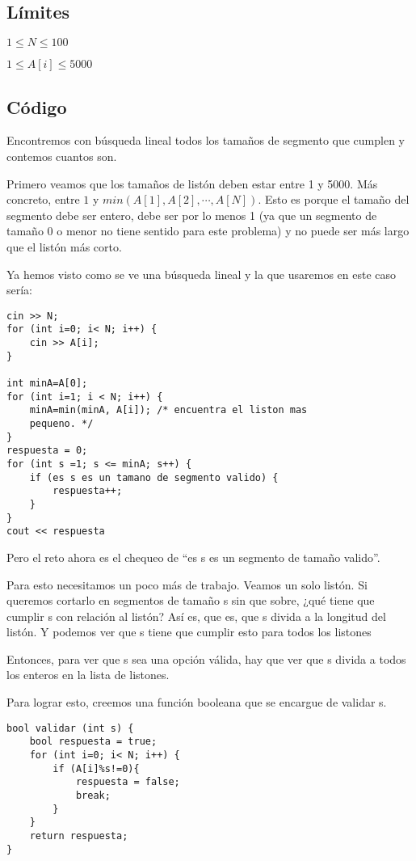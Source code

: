 \subsection*{Límites}
\begin{plimits}
	\item \(1\leq N \leq 100\)
	\item \(1\leq A[i] \leq 5000\)
\end{plimits}

\subsection*{Código}
Encontremos con búsqueda lineal todos los tamaños de segmento que cumplen y contemos cuantos son.

Primero veamos que los tamaños de listón deben estar entre 1 y 5000. Más concreto, entre \(1\) y \(min (A[1],A[2],\cdots ,A[N])\). Esto es porque el tamaño del segmento debe ser entero, debe ser por lo menos 1 (ya que un segmento de tamaño 0 o menor no tiene sentido para este problema) y no puede ser más largo que el listón más corto.

Ya hemos visto como se ve una búsqueda lineal y la que usaremos en este caso sería:

\begin{lstlisting}
cin >> N;
for (int i=0; i< N; i++) {
	cin >> A[i];
}

int minA=A[0];
for (int i=1; i < N; i++) {
	minA=min(minA, A[i]); /* encuentra el liston mas
	pequeno. */
}
respuesta = 0;
for (int s =1; s <= minA; s++) {
	if (es s es un tamano de segmento valido) {
		respuesta++;
	}
}
cout << respuesta

\end{lstlisting}

Pero el reto ahora es el chequeo de “es s es un segmento de tamaño valido”.

Para esto necesitamos un poco más de trabajo. Veamos un solo listón. Si queremos cortarlo en segmentos de tamaño s sin que sobre, ¿qué tiene que cumplir s con relación al listón? Así es, que es, que s divida a la longitud del listón. Y podemos ver que s tiene que cumplir esto para todos los listones

Entonces, para ver que s sea una opción válida, hay que ver que s divida a todos los enteros en la lista de listones.

Para lograr esto, creemos una función booleana que se encargue de validar s.
\begin{lstlisting}
bool validar (int s) {
	bool respuesta = true;
	for (int i=0; i< N; i++) {
		if (A[i]%s!=0){
			respuesta = false;
			break;
		}
	}
	return respuesta;
}
\end{lstlisting}

